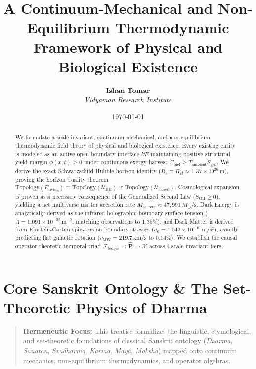 \documentclass[11pt,a4paper]{article}
\title{\textbf{A Continuum-Mechanical and Non-Equilibrium Thermodynamic Framework of Physical and Biological Existence}}
\author{\textbf{Ishan Tomar} \\ \textit{Vidyaman Research Institute}}
\date{\today}
\theoremstyle{definition}
\theoremstyle{remark}
\begin{document}
\maketitle

\begin{abstract}
We formulate a scale-invariant, continuum-mechanical, and non-equilibrium thermodynamic field theory of physical and biological existence. Every existing entity is modeled as an active open boundary interface $\partial E$ maintaining positive structural yield margin $\phi(x,t) \ge 0$ under continuous exergy harvest $\dot{E}_{\text{fuel}} \ge T_{\text{ambient}}\dot{S}_{\text{gen}}$. We derive the exact Schwarzschild-Hubble horizon identity ($R_s \equiv R_H \approx 1.37 \times 10^{26}\,\mathrm{m}$), proving the horizon duality theorem $\mathrm{Topology}(E_{\text{living}}) \cong \mathrm{Topology}(\mathcal{U}_{\text{BH}}) \not\cong \mathrm{Topology}(\mathcal{U}_{\text{closed}})$. Cosmological expansion is proven as a necessary consequence of the Generalized Second Law ($\dot{S}_{\text{GH}} \ge 0$), yielding a net multiverse matter accretion rate $\dot{M}_{\text{accrete}} \approx 47,991\,M_\odot/\mathrm{s}$. Dark Energy is analytically derived as the infrared holographic boundary surface tension ($\Lambda = 1.091 \times 10^{-52}\,\mathrm{m^{-2}}$, matching observations to $1.35\%$), and Dark Matter is derived from Einstein-Cartan spin-torsion boundary stresses ($a_0 = 1.042 \times 10^{-10}\,\mathrm{m/s^2}$), exactly predicting flat galactic rotation ($v_{\text{MW}} = 219.7\,\mathrm{km/s}$ to $0.14\%$). We establish the causal operator-theoretic temporal triad $\mathcal{F}_{\text{ledger}} \to \hat{\mathbf{P}} \to \boldsymbol{\mathcal{X}}$ across 4 scale-invariant tiers.
\end{abstract}

\vspace{1em}
\tableofcontents
\newpage


\section*{Core Sanskrit Ontology \& The Set-Theoretic Physics of Dharma}

\begin{quote}\textbf{Hermeneutic Focus:} This treatise formalizes the linguistic, etymological, and set-theoretic foundations of classical Sanskrit ontology (\textit{Dharma}, \textit{Sanatan}, \textit{Svadharma}, \textit{Karma}, \textit{Māyā}, \textit{Moksha}) mapped onto continuum mechanics, non-equilibrium thermodynamics, and operator algebras.\end{quote}
\end{document}
